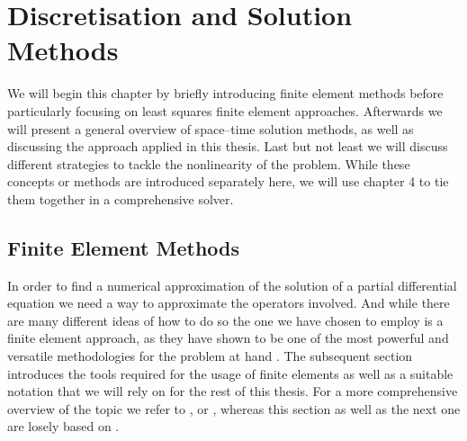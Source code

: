 \documentclass[../draft_1.tex]{subfiles}
\begin{document}
\chapter{Discretisation and Solution Methods}

We will begin this chapter by briefly introducing finite element methods before particularly focusing on least squares finite element approaches. Afterwards we will present a general overview of space--time solution methods, as well as discussing the approach applied in this thesis. Last but not least we will discuss different strategies to tackle the nonlinearity of the problem. While these concepts or methods are introduced separately here, we will use chapter 4 to tie them together in a comprehensive solver.


\section{Finite Element Methods}
\label{FEM_section}
In order to find a numerical approximation of the solution of a partial differential equation we need a way to approximate the operators involved. And while there are many different ideas of how to do so the one we have chosen to employ is a finite element approach, as they have shown to be one of the most powerful and versatile methodologies for the problem at hand \cite{bochev2009least}. The subsequent section introduces the tools required for the usage of finite elements as well as a suitable notation that we will rely on for the rest of this thesis. For a more comprehensive overview of the topic we refer to \cite{evans2010partial}, \cite{braess2007finite} or \cite{ciarlet2016partial}, whereas this section as well as the next one are losely based on \cite{bochev2009least}.


\end{document}
